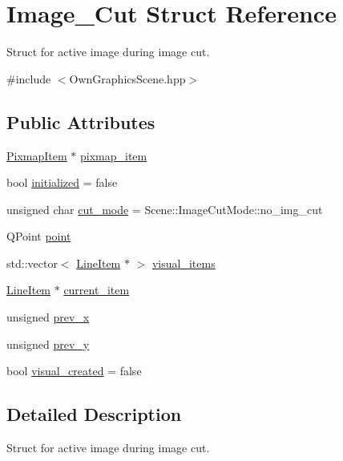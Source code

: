 \hypertarget{structImage__Cut}{}\section{Image\+\_\+\+Cut Struct Reference}
\label{structImage__Cut}


Struct for active image during image cut.  




{\ttfamily \#include $<$Own\+Graphics\+Scene.\+hpp$>$}

\subsection*{Public Attributes}
\begin{DoxyCompactItemize}
\item 
\mbox{\hyperlink{classPixmapItem}{Pixmap\+Item}} $\ast$ \mbox{\hyperlink{structImage__Cut_afdafc46c968b35b63758d409ef863a8f}{pixmap\+\_\+item}}
\item 
bool \mbox{\hyperlink{structImage__Cut_a7259136300a6eade3ee84743f3e47c1f}{initialized}} = false
\item 
unsigned char \mbox{\hyperlink{structImage__Cut_ad4904a8753086961301a91050f6b2794}{cut\+\_\+mode}} = Scene\+::\+Image\+Cut\+Mode\+::no\+\_\+img\+\_\+cut
\item 
Q\+Point \mbox{\hyperlink{structImage__Cut_a45fc996285a5ae8ef255d66655d63df2}{point}}
\item 
std\+::vector$<$ \mbox{\hyperlink{classLineItem}{Line\+Item}} $\ast$ $>$ \mbox{\hyperlink{structImage__Cut_ad56f1d72a3d7c5488fec27eaf5c6fbd9}{visual\+\_\+items}}
\item 
\mbox{\hyperlink{classLineItem}{Line\+Item}} $\ast$ \mbox{\hyperlink{structImage__Cut_aa3fcac1ab311c38947b343d8913fb2e8}{current\+\_\+item}}
\item 
unsigned \mbox{\hyperlink{structImage__Cut_a9e6768e7bea9a60876d086d78da3c4df}{prev\+\_\+x}}
\item 
unsigned \mbox{\hyperlink{structImage__Cut_ad86dabb21b97270448d8db5aa7a5676f}{prev\+\_\+y}}
\item 
bool \mbox{\hyperlink{structImage__Cut_acbae7507f135d85e9f2f9724fbc2a643}{visual\+\_\+created}} = false
\end{DoxyCompactItemize}


\subsection{Detailed Description}
Struct for active image during image cut. 

